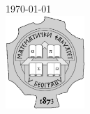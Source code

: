 \begin{titlepage}


{\large \today}\\[2cm] %


\includegraphics[width=30mm]{slike/logo.jpg}\\[1cm] %
 

\vfill %

\end{titlepage}